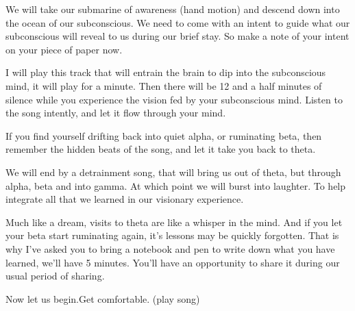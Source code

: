 We will take our submarine of awareness (hand motion) and descend down into the
ocean of our subconscious. We need to come with an intent to guide what our
subconscious will reveal to us during our brief stay. So make a note of your
intent on your piece of paper now. 

I will play this track that will entrain the brain to dip into the subconscious
mind, it will play for a minute. Then there will be 12 and a half minutes of
silence while you experience the vision fed by your subconscious mind. Listen to
the song intently, and let it flow through your mind. 

If you find yourself drifting back into quiet alpha, or ruminating beta, then
remember the hidden beats of the song, and let it take you back to theta. 

We will end by a detrainment song, that will bring us out of theta, but through
alpha, beta and into gamma. At which point we will burst into laughter. To help
integrate all that we learned in our visionary experience.

Much like a dream, visits to theta are like a whisper in the mind. And if you
let your beta start ruminating again, it's lessons may be quickly forgotten.
That is why I've asked you to bring a notebook and pen to write down what you
have learned, we'll have 5 minutes.  You'll have an opportunity to share it
during our usual period of sharing. 

Now let us begin.Get comfortable. 
(play song) 


